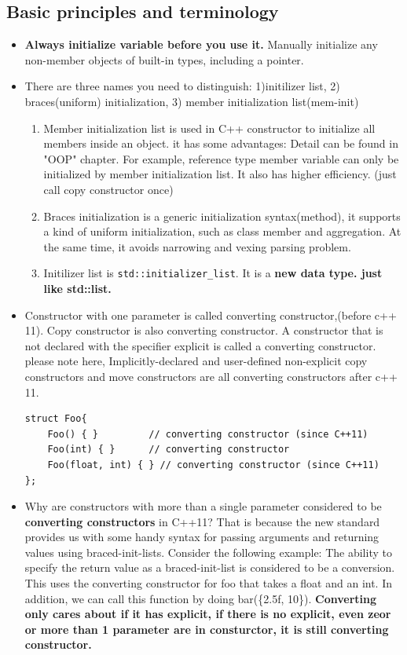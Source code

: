\documentclass[a4paper,11pt,twoside]{book}
\begin{document}
\subsection{Basic principles and terminology}
\begin{itemize}
	\item \textbf{Always initialize variable before you use it.} Manually initialize any non-member objects of built-in types, including a pointer.
	
	\item There are three names you need to distinguish: 1)initilizer list, 2) braces(uniform) initialization, 3) member initialization list(mem-init)

	\begin{enumerate}
		\item Member initialization list is used in C++ constructor to initialize all members inside an object. it has some advantages: Detail can be found in "OOP" chapter. For example, reference type member variable can only be initialized by member initialization list. It also has higher efficiency. (just call copy constructor once) 
		
		\item Braces initialization is a generic initialization syntax(method), it supports a kind of uniform initialization, such as class member and aggregation. At the same time, it avoids narrowing and vexing parsing problem. 
		
		\item Initilizer list is \texttt{std::initializer\_list}. It is a \textbf{new data type. just like std::list.}
	\end{enumerate}

	\item Constructor with one parameter is called converting constructor,(before c++ 11). Copy constructor is also converting constructor. A constructor that is not declared with the specifier explicit is called a converting constructor. please note here, Implicitly-declared and user-defined non-explicit copy constructors and move constructors are all converting constructors after c++ 11.

\begin{lstlisting}[numbers=none]
struct Foo{
	Foo() { }         // converting constructor (since C++11)  
	Foo(int) { }      // converting constructor
	Foo(float, int) { } // converting constructor (since C++11)
};
\end{lstlisting}	

	\item Why are constructors with more than a single parameter considered to be \textbf{converting constructors} in C++11? That is because the new standard provides us with some handy syntax for passing arguments and returning values using braced-init-lists. Consider the following example: The ability to specify the return value as a braced-init-list is considered to be a conversion. This uses the converting constructor for foo that takes a float and an int. In addition, we can call this function by doing bar(\{2.5f, 10\}). \textbf{Converting only cares about if it has explicit, if there is no explicit, even zeor or more than 1 parameter are in consturctor, it is still converting constructor.} 


\end{itemize}
\end{document}
